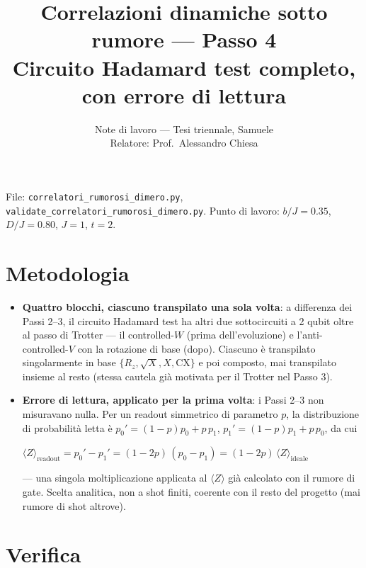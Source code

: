 \documentclass[11pt,a4paper]{article}
\title{\vspace{-1.5em}\color{inkblue}Correlazioni dinamiche sotto rumore --- Passo 4\\[0.2em]
\Large\normalfont\color{softgray}Circuito Hadamard test completo, con errore di lettura}
\author{Note di lavoro --- Tesi triennale, Samuele\\ Relatore: Prof.\ Alessandro Chiesa}
\date{}
\begin{document}
\sloppy
\maketitle
\thispagestyle{fancy}
\vspace{-2.2em}

File: \texttt{correlatori\_rumorosi\_dimero.py}, \texttt{validate\_correlatori\_rumorosi\_dimero.py}.
Punto di lavoro: $b/J=0.35$, $D/J=0.80$, $J=1$, $t=2$.

\section*{Metodologia}

\begin{itemize}[leftmargin=1.3em,itemsep=0.3em]
\item \textbf{Quattro blocchi, ciascuno transpilato una sola volta}: a
differenza dei Passi 2--3, il circuito Hadamard test ha altri due
sottocircuiti a 2 qubit oltre al passo di Trotter --- il controlled-$W$
(prima dell'evoluzione) e l'anti-controlled-$V$ con la rotazione di base
(dopo). Ciascuno è transpilato singolarmente in base
$\{R_z,\sqrt X,X,\text{CX}\}$ e poi composto, mai transpilato insieme al
resto (stessa cautela già motivata per il Trotter nel Passo 3).
\item \textbf{Errore di lettura, applicato per la prima volta}: i Passi
2--3 non misuravano nulla. Per un readout simmetrico di parametro $p$, la
distribuzione di probabilità letta è $p_0'=(1-p)p_0+p\,p_1$,
$p_1'=(1-p)p_1+p\,p_0$, da cui
\begin{keyeq}
\centering
$\langle Z\rangle_\text{readout} = p_0'-p_1' = (1-2p)\,(p_0-p_1) =
(1-2p)\,\langle Z\rangle_\text{ideale}$
\end{keyeq}
--- una singola moltiplicazione applicata al $\langle Z\rangle$ già
calcolato con il rumore di gate. Scelta analitica, non a shot finiti,
coerente con il resto del progetto (mai rumore di shot altrove).
\end{itemize}

\section*{Verifica}
\end{document}
